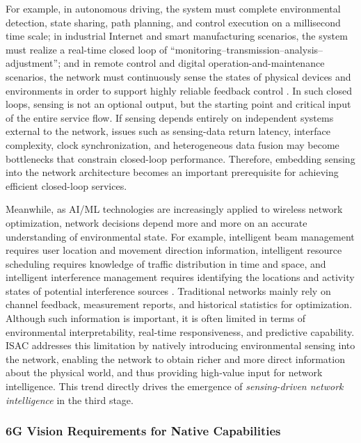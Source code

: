 For example, in autonomous driving, the system must complete environmental detection, state sharing, path planning, and control execution on a millisecond time scale; in industrial Internet and smart manufacturing scenarios, the system must realize a real-time closed loop of ``monitoring--transmission--analysis--adjustment''; and in remote control and digital operation-and-maintenance scenarios, the network must continuously sense the states of physical devices and environments in order to support highly reliable feedback control \cite{Liu2022ISAC,Saad2020Vision6G}. In such closed loops, sensing is not an optional output, but the starting point and critical input of the entire service flow. If sensing depends entirely on independent systems external to the network, issues such as sensing-data return latency, interface complexity, clock synchronization, and heterogeneous data fusion may become bottlenecks that constrain closed-loop performance. Therefore, embedding sensing into the network architecture becomes an important prerequisite for achieving efficient closed-loop services.

Meanwhile, as AI/ML technologies are increasingly applied to wireless network optimization, network decisions depend more and more on an accurate understanding of environmental state. For example, intelligent beam management requires user location and movement direction information, intelligent resource scheduling requires knowledge of traffic distribution in time and space, and intelligent interference management requires identifying the locations and activity states of potential interference sources \cite{Saad2020Vision6G}. Traditional networks mainly rely on channel feedback, measurement reports, and historical statistics for optimization. Although such information is important, it is often limited in terms of environmental interpretability, real-time responsiveness, and predictive capability. ISAC addresses this limitation by natively introducing environmental sensing into the network, enabling the network to obtain richer and more direct information about the physical world, and thus providing high-value input for network intelligence. This trend directly drives the emergence of \emph{sensing-driven network intelligence} in the third stage.

\subsubsection{6G Vision Requirements for Native Capabilities}
\label{subsubsec:ch1-driving-force-6g-vision}

